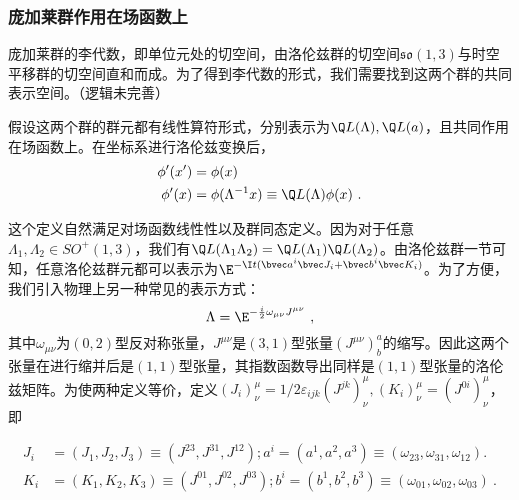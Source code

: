 \subsubsection{庞加莱群作用在场函数上}
庞加莱群的李代数，即单位元处的切空间，由洛伦兹群的切空间$\mathfrak {so}(1,3)$与时空平移群的切空间直和而成。为了得到李代数的形式，我们需要找到这两个群的共同表示空间。（逻辑未完善）

假设这两个群的群元都有线性算符形式，分别表示为$\Q L(\Lambda),\Q L(a)$，且共同作用在场函数上。在坐标系进行洛伦兹变换后，
\begin{equation}\label{eq_PoinGr_1}
\begin{aligned}
\phi'(x')&=\phi(x)\\
\phi'(x)&=\phi(\Lambda^{-1}x)\equiv \Q L(\Lambda)\phi(x)~.
\end{aligned}
\end{equation}

这个定义自然满足对场函数线性性以及群同态定义。因为对于任意$\Lambda_1,\Lambda_2\in SO^+(1,3)$，我们有$\Q L(\Lambda_1\Lambda_2)=\Q L(\Lambda_1)\Q L(\Lambda_2)$。由洛伦兹群一节可知，任意洛伦兹群元都可以表示为$\E^{-\I t(\bvec a^i\bvec J_i+\bvec b^i\bvec K_i)}$。为了方便，我们引入物理上另一种常见的表示方式：
\begin{equation}
\Lambda=\E^{-\frac{i}{2} \omega_{\mu \nu} J^{\mu \nu}}
~,
\end{equation}
其中$\omega_{\mu\nu}$为$(0,2)$型反对称张量，$J^{\mu\nu}$是$(3,1)$型张量$(J^{\mu\nu})^a_b$的缩写。因此这两个张量在进行缩并后是$(1,1)$型张量，其指数函数导出同样是$(1,1)$型张量的洛伦兹矩阵。为使两种定义等价，定义$(J_i)^{\mu}_{\nu}=1/2\varepsilon_{ijk}(J^{jk})^{\mu}_{\nu},(K_i)^{\mu}_{\nu}=(J^{0i})^{\mu}_{\nu}$，即

\begin{equation}\label{eq_PoinGr_2}
\begin{aligned}
J_i&=(J_1,J_2,J_3)\equiv(J^{23},J^{31},J^{12});a^i=(a^1,a^2,a^3)\equiv(\omega_{23},\omega_{31},\omega_{12}).\\
K_i&=(K_1,K_2,K_3)\equiv(J^{01},J^{02},J^{03});b^i=(b^1,b^2,b^3)\equiv(\omega_{01},\omega_{02},\omega_{03})~.
\end{aligned}
\end{equation}

